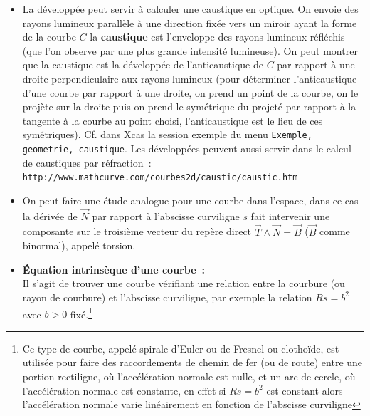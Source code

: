 \documentclass[a4paper,11pt]{article}
\begin{document}
\begin{giacjshere}
\begin{itemize}
sont inclus les uns dans les autres, c'est une cons\'equence
de la remarque pr\'ec\'edente, de l'in\'egalit\'e triangulaire
et du fait que la distance entre deux centres de cercles
osculateurs est plus petite que la longueur d'arc sur la
d\'evelopp\'ee. Comme les points de la courbe sont
sur des cercles osculateurs, il en r\'esulte que la courbe
entre ou sort d\'efinitivement du cercle osculateur au point
de contact.
\item La d\'evelopp\'ee peut servir \`a calculer une caustique en
optique. On envoie des rayons lumineux parall\`ele \`a une
direction fix\'ee vers un miroir ayant la forme de la courbe $C$
la {\bf caustique} 
est l'enveloppe des rayons lumineux r\'efl\'echis
(que l'on observe par une plus grande intensit\'e lumineuse).
On peut montrer que la caustique est la d\'evelopp\'ee 
de l'anticaustique de $C$ par rapport \`a une droite perpendiculaire
aux rayons lumineux (pour d\'eterminer 
l'anticaustique d'une courbe par rapport
\`a une droite, on prend un point de la courbe, on le proj\`ete sur
la droite puis on prend le sym\'etrique du projet\'e par rapport \`a la
tangente \`a la courbe au point choisi, 
l'anticaustique est le lieu de ces sym\'etriques). 
Cf. dans Xcas la session exemple du
menu \verb|Exemple, geometrie, caustique|.
Les d\'evelopp\'ees peuvent aussi servir dans le calcul de caustiques
par r\'efraction~:
\verb|http://www.mathcurve.com/courbes2d/caustic/caustic.htm|
\item On peut faire une \'etude analogue pour une courbe dans
  l'espace, dans ce cas la d\'eriv\'ee de $\vec{N}$
par rapport \`a l'abscisse curviligne $s$ fait intervenir une
composante sur le troisi\`eme vecteur du rep\`ere direct
$\vec{T} \wedge\vec{N}=\vec{B}$ 
($\vec{B}$ comme binormal), appel\'e
torsion.
\item {\bf \'Equation intrins\`eque d'une courbe~:}\\
Il s'agit de trouver une courbe v\'erifiant une relation entre la
courbure (ou rayon de courbure) et l'abscisse curviligne, par exemple
la relation $Rs=b^2$ avec $b>0$ fix\'e.\footnote{Ce type de courbe, appel\'e
spirale d'Euler ou de Fresnel ou clotho\"ide, est utilis\'ee pour
faire des raccordements de chemin de fer (ou de route) 
entre une portion rectiligne, o\`u l'acc\'el\'eration normale est
nulle, et un arc de cercle, o\`u l'acc\'el\'eration normale est
constante, en effet si $Rs=b^2$ est constant alors l'acc\'el\'eration
normale varie lin\'eairement en fonction de l'abscisse curviligne
}
\end{itemize}
\end{giacjshere}
\end{document}
